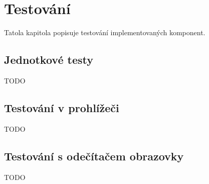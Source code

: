 \chapter{Testování}

Tatola kapitola popisuje testování implementovaných komponent.

\section{Jednotkové testy}

TODO

\section{Testování v prohlížeči}

TODO

\section{Testování s odečítačem obrazovky}

TODO
